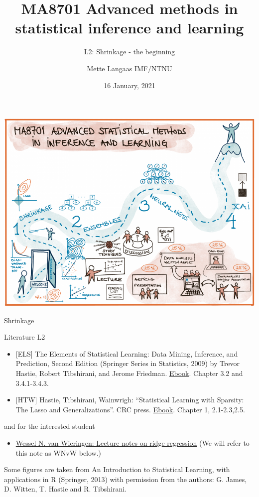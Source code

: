 \documentclass[
  ignorenonframetext,
]{beamer}
\title{MA8701 Advanced methods in statistical inference and learning}
\subtitle{L2: Shrinkage - the beginning}
\author{Mette Langaas IMF/NTNU}
\date{16 January, 2021}
\providecommand{\tightlist}{%
  \setlength{\itemsep}{0pt}\setlength{\parskip}{0pt}}
\begin{document}
\frame{\titlepage}

\begin{frame}

\includegraphics{../overviewv1.png}

\end{frame}

\begin{frame}{Shrinkage}
\protect\hypertarget{shrinkage}{}

\begin{block}{Literature L2}

\begin{itemize}
\item
  {[}ELS{]} The Elements of Statistical Learning: Data Mining,
  Inference, and Prediction, Second Edition (Springer Series in
  Statistics, 2009) by Trevor Hastie, Robert Tibshirani, and Jerome
  Friedman.
  \href{https://web.stanford.edu/~hastie/Papers/ESLII.pdf}{Ebook}.
  Chapter 3.2 and 3.4.1-3.4.3.
\item
  {[}HTW{]} Hastie, Tibshirani, Wainwrigh: ``Statistical Learning with
  Sparsity: The Lasso and Generalizations''. CRC press.
  \href{https://trevorhastie.github.io/}{Ebook}. Chapter 1, 2.1-2.3,2.5.
\end{itemize}

and for the interested student

\begin{itemize}
\tightlist
\item
  \href{https://arxiv.org/pdf/1509.09169.pdf}{Wessel N. van Wieringen:
  Lecture notes on ridge regression} (We will refer to this note as WNvW
  below.)
\end{itemize}

Some figures are taken from An Introduction to Statistical Learning,
with applications in R (Springer, 2013) with permission from the
authors: G. James, D. Witten, T. Hastie and R. Tibshirani.

\end{block}

\end{frame}
\end{document}
